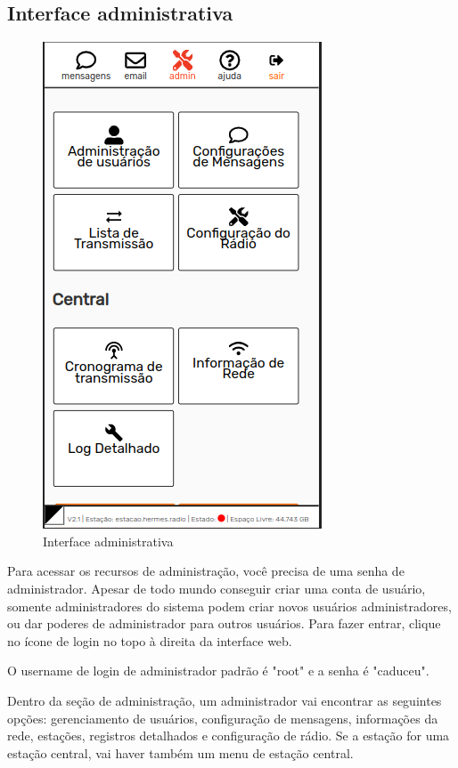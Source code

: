 \documentclass[11pt,a4paper]{article}
\begin{document}
\subsection{Interface administrativa}
\label{admininterface}

\begin{figure}[H]
    \centering
    \includegraphics[width=0.5\columnwidth]{screenshots/frontend/pt_kn/admin.png}
    \caption{Interface administrativa}
    \label{fig:admin}
\end{figure}

Para acessar os recursos de administração, você precisa de uma senha de administrador. Apesar de todo mundo conseguir criar uma conta de usuário, somente administradores do sistema podem criar novos usuários administradores, ou dar poderes de administrador para outros usuários. Para fazer entrar, clique no ícone de login no topo à direita da interface web.


O username de login de administrador padrão é "root" e a senha é "caduceu".


Dentro da seção de administração, um administrador vai encontrar as seguintes opções: gerenciamento de usuários, configuração de mensagens, informações da rede, estações, registros detalhados e configuração de rádio. Se a estação for uma estação central, vai haver também um menu de estação central.
\end{document}
